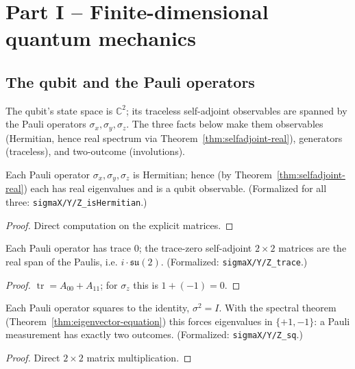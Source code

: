\chapter{Part I -- Finite-dimensional quantum mechanics}

\section{The qubit and the Pauli operators}

The qubit's state space is $\mathbb{C}^2$; its traceless self-adjoint observables
are spanned by the Pauli operators $\sigma_x,\sigma_y,\sigma_z$. The three facts
below make them observables (Hermitian, hence real spectrum via
Theorem~\ref{thm:selfadjoint-real}), generators (traceless), and two-outcome
(involutions).

\begin{lemma}
  \label{lem:pauli-hermitian}
  \leanok
  Each Pauli operator $\sigma_x,\sigma_y,\sigma_z$ is Hermitian; hence (by
  Theorem~\ref{thm:selfadjoint-real}) each has real eigenvalues and is a qubit
  observable. (Formalized for all three: \texttt{sigmaX/Y/Z\_isHermitian}.)
\end{lemma}
\begin{proof}\leanok Direct computation on the explicit matrices. \end{proof}

\begin{lemma}
  \label{lem:pauli-traceless}
  \leanok
  Each Pauli operator has trace $0$; the trace-zero self-adjoint $2\times2$
  matrices are the real span of the Paulis, i.e. $i\cdot\mathfrak{su}(2)$.
  (Formalized: \texttt{sigmaX/Y/Z\_trace}.)
\end{lemma}
\begin{proof}\leanok $\operatorname{tr} = A_{00}+A_{11}$; for $\sigma_z$ this is
  $1+(-1)=0$. \end{proof}

\begin{lemma}
  \label{lem:pauli-involution}
  \leanok
  Each Pauli operator squares to the identity, $\sigma^2 = I$. With the spectral
  theorem (Theorem~\ref{thm:eigenvector-equation}) this forces eigenvalues in
  $\{+1,-1\}$: a Pauli measurement has exactly two outcomes.
  (Formalized: \texttt{sigmaX/Y/Z\_sq}.)
\end{lemma}
\begin{proof}\leanok Direct $2\times2$ matrix multiplication. \end{proof}


